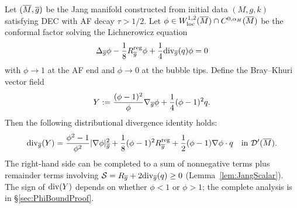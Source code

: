 \begin{lemma}\label{lem:BrayKhuriDistributional}
Let $(\overline{M}, \overline{g})$ be the Jang manifold constructed from initial data $(M, g, k)$ satisfying DEC with AF decay $\tau > 1/2$. Let $\phi \in W^{1,2}_{\mathrm{loc}}(\overline{M}) \cap C^{0,\alpha_H}(\overline{M})$ be the conformal factor solving the Lichnerowicz equation
\begin{equation}
    \Delta_{\overline{g}} \phi - \frac{1}{8}R_{\overline{g}}^{\mathrm{reg}} \phi + \frac{1}{4}\mathrm{div}_{\overline{g}}(q) \phi = 0
\end{equation}
with $\phi \to 1$ at the AF end and $\phi \to 0$ at the bubble tips. Define the Bray--Khuri vector field
\begin{equation}
    Y := \frac{(\phi - 1)^2}{\phi} \nabla_{\overline{g}} \phi + \frac{1}{4}(\phi - 1)^2 q.
\end{equation}
Then the following distributional divergence identity holds:
\begin{equation}\label{eq:BKDistributional}
    \mathrm{div}_{\overline{g}}(Y) = \frac{\phi^2-1}{\phi^2}|\nabla \phi|^2_{\overline{g}} + \frac{1}{8}(\phi-1)^2 R^{\mathrm{reg}}_{\overline{g}} + \frac{1}{2}(\phi-1)\nabla\phi \cdot q \quad \text{in } \mathcal{D}'(\overline{M}).
\end{equation}
The right-hand side can be completed to a sum of nonnegative terms plus remainder terms involving $\mathcal{S} = R_{\overline{g}} + 2\mathrm{div}_{\overline{g}}(q) \ge 0$ (Lemma~\ref{lem:JangScalar}). The sign of $\mathrm{div}(Y)$ depends on whether $\phi < 1$ or $\phi > 1$; the complete analysis is in \S\ref{sec:PhiBoundProof}.
\end{lemma}

